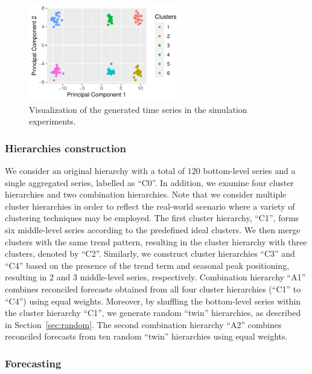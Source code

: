 \documentclass[a4paper,review,12pt,authoryear]{elsarticle}
\begin{document}
\begin{figure}
    \centering
    \includegraphics[width=0.6\textwidth]{figures/simu_pca.pdf}
    \caption{\label{fig:simu_pca}Visualization of the generated time series in the simulation experiments.}
\end{figure}

\subsubsection*{Hierarchies construction}

We consider an original hierarchy with a total of $120$ bottom-level series and a single aggregated series, labelled as ``C0''. In addition, we examine four cluster hierarchies and two combination hierarchies. Note that we consider multiple cluster hierarchies in order to reflect the real-world scenario where a variety of clustering techniques may be employed. The first cluster hierarchy, ``C1'', forms six middle-level series according to the predefined ideal clusters. We then merge clusters with the same trend pattern, resulting in the cluster hierarchy with three clusters, denoted by ``C2''. Similarly, we construct cluster hierarchies ``C3'' and ``C4'' based on the presence of the trend term and seasonal peak positioning, resulting in $2$ and $3$ middle-level series, respectively. Combination hierarchy ``A1'' combines reconciled forecasts obtained from all four cluster hierarchies (``C1'' to ``C4'') using equal weights. Moreover, by shuffling the bottom-level series within the cluster hierarchy ``C1'', we generate random ``twin'' hierarchies, as described in Section~\ref{sec:random}. The second combination hierarchy ``A2'' combines reconciled forecasts from ten random ``twin'' hierarchies using equal weights.

\subsubsection*{Forecasting}
\end{document}
